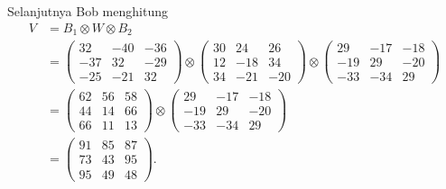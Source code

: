 \documentclass[aspectratio=169]{beamer}
\theoremstyle{definition}
\numberwithin{definisi}{section}
\begin{document}
\begin{frame}
  \frametitle{\insertsection}
  Selanjutnya Bob menghitung
  \begin{align*}
    V & = B_1 \otimes W \otimes B_2 \\
      & =
    \begin{pmatrix}
      32  & -40 & -36 \\
      -37 & 32  & -29 \\
      -25 & -21 & 32
    \end{pmatrix}
    \otimes
    \begin{pmatrix}
      30 & 24  & 26  \\
      12 & -18 & 34  \\
      34 & -21 & -20
    \end{pmatrix}
    \otimes
    \begin{pmatrix}
      29  & -17 & -18 \\
      -19 & 29  & -20 \\
      -33 & -34 & 29
    \end{pmatrix}                 \\
      & =
    \begin{pmatrix}
      62 & 56 & 58 \\
      44 & 14 & 66 \\
      66 & 11 & 13
    \end{pmatrix}
    \otimes
    \begin{pmatrix}
      29  & -17 & -18 \\
      -19 & 29  & -20 \\
      -33 & -34 & 29
    \end{pmatrix}                 \\
      & =
    \begin{pmatrix}
      91 & 85 & 87 \\
      73 & 43 & 95 \\
      95 & 49 & 48
    \end{pmatrix}.
  \end{align*}
\end{frame}
\end{document}
